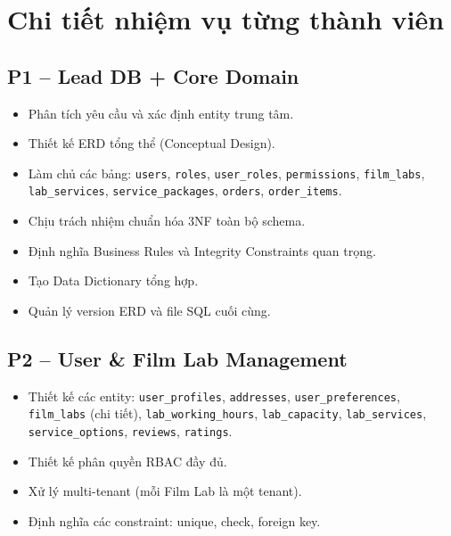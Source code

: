 \documentclass[12pt,a4paper]{article}
\begin{document}
\vspace{10pt}

\section{Chi tiết nhiệm vụ từng thành viên}

\subsection{P1 -- Lead DB + Core Domain}

\begin{itemize}[leftmargin=*]
    \item Phân tích yêu cầu và xác định entity trung tâm.
    \item Thiết kế ERD tổng thể (Conceptual Design).
    \item Làm chủ các bảng: \texttt{users}, \texttt{roles}, \texttt{user\_roles}, \texttt{permissions}, \texttt{film\_labs}, \texttt{lab\_services}, \texttt{service\_packages}, \texttt{orders}, \texttt{order\_items}.
    \item Chịu trách nhiệm chuẩn hóa 3NF toàn bộ schema.
    \item Định nghĩa Business Rules và Integrity Constraints quan trọng.
    \item Tạo Data Dictionary tổng hợp.
    \item Quản lý version ERD và file SQL cuối cùng.
   
\end{itemize}

\vspace{8pt}

\subsection{P2 -- User \& Film Lab Management}

\begin{itemize}[leftmargin=*]
    \item Thiết kế các entity: \texttt{user\_profiles}, \texttt{addresses}, \texttt{user\_preferences}, \texttt{film\_labs} (chi tiết), \texttt{lab\_working\_hours}, \texttt{lab\_capacity}, \texttt{lab\_services}, \texttt{service\_options}, \texttt{reviews}, \texttt{ratings}.
    \item Thiết kế phân quyền RBAC đầy đủ.
    \item Xử lý multi-tenant (mỗi Film Lab là một tenant).
    \item Định nghĩa các constraint: unique, check, foreign key.
\end{itemize}
\end{document}
